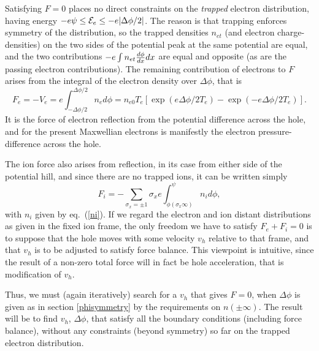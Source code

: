 \documentclass[12pt]{article}
\def\energy{{\cal E}}
\begin{document}
Satisfying $F=0$ places no direct constraints on the \emph{trapped}
electron distribution, having energy
$-e\psi\le \energy_e \le -e|\Delta \phi/2|$. The reason is that
trapping enforces symmetry of the distribution, so the trapped
densities $n_{et}$ (and electron charge-densities) on the two sides of
the potential peak at the same potential are equal, and the two contributions
$-e\int n_{et} {d\phi\over dx} dx$ are equal and opposite (as are the
passing electron contributions). The remaining
contribution of electrons to $F$ arises from the integral of the
electron density over $\Delta\phi$, that is
\begin{equation}\label{Fe}
F_e=-V_e=e\int_{-\Delta\phi/2}^{\Delta\phi/2} n_{e}
d\phi=n_{e0}T_e[\exp(e\Delta\phi/2T_e)-\exp(-e\Delta\phi/2T_e)].
\end{equation} It
is the force of electron reflection from the potential
difference across the hole, and for the present Maxwellian electrons
is manifestly the electron pressure-difference across the hole.

The ion force also arises from reflection, in its case from either
side of the potential hill, and since there are no trapped ions, it
can be written simply
\begin{equation}\label{Fi}
F_i=-\sum_{\sigma_x=\pm1} \sigma_x e \int_{\phi(\sigma_x\infty)}^\psi
n_i d\phi,
\end{equation}
with $n_i$ given by eq.\ (\ref{ni}). If we regard the
electron and ion distant distributions as given in the fixed ion frame,
the only freedom we have to satisfy $F_e+F_i=0$ is to suppose that the
hole moves with some velocity $v_h$ relative to that frame, and that
$v_h$ is to be adjusted to satisfy force balance. This viewpoint is
intuitive, since the result of a non-zero total force will in fact be
hole acceleration, that is modification of $v_h$.

Thus, we must (again iteratively) search for a $v_h$ that gives $F=0$,
when $\Delta\phi$ is given as in section \ref{phisymmetry} by the
requirements on $n(\pm\infty)$. The result will be to find $v_h$,
$\Delta\phi$, that satisfy all the boundary conditions (including
force balance), without any constraints (beyond symmetry) so far on
the trapped electron distribution.
\end{document}
